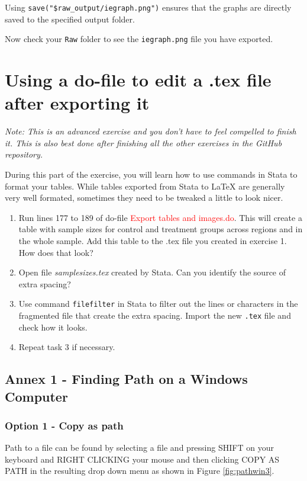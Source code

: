 \documentclass[]{article}
\begin{document}
Using \verb|save("$raw_output/iegraph.png")| ensures that the graphs are directly saved to the specified output folder. 

Now check your \texttt{Raw} folder to see the \texttt{iegraph.png} file you have exported.


\section{Using a do-file to edit a .tex file after exporting it}
\textit{Note: This is an advanced exercise and you don't have to feel compelled to finish it. This is also best done after finishing all the other exercises in the GitHub repository.}

During this part of the exercise, you will learn how to use commands in Stata to format your tables. While tables exported from Stata to {\LaTeX} are generally very well formated, sometimes they need to be tweaked a little to look nicer.

\begin{enumerate}
	\item Run lines 177 to 189 of do-file \textcolor{red}{Export tables and images.do}. This will create a table with sample sizes for control and treatment groups across regions and in the whole sample. Add this table to the .tex file you created in exercise 1. How does that look?
	\item Open file \emph{samplesizes.tex} created by Stata. Can you identify the source of extra spacing?
	\item Use command \texttt{filefilter} in Stata to filter out the lines or characters in the fragmented file that create the extra spacing. Import the new \texttt{.tex} file and check how it looks.
	\item Repeat task 3 if necessary.
\end{enumerate}

\newpage

\subsection*{Annex 1 - Finding Path on a Windows Computer}\label{annex:windows}

\subsubsection*{Option 1 - Copy as path}
Path to a file can be found by selecting a file and pressing {\color{red}SHIFT on your keyboard and RIGHT CLICKING your mouse and then clicking COPY AS PATH in the resulting drop down menu} as shown in Figure \ref{fig:pathwin3}.
\end{document}
